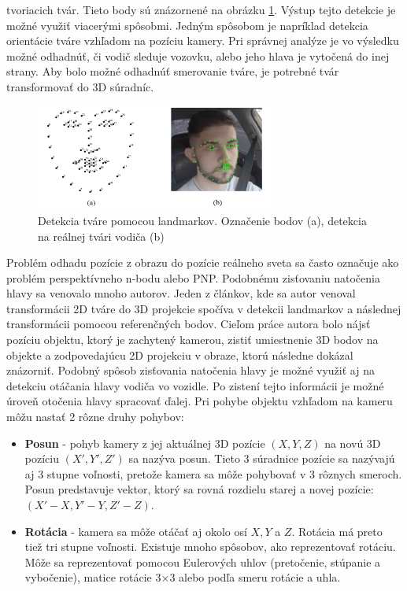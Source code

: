 \documentclass[slovak,master,dept460,male,cpp,cpdeclaration]{diploma}
\begin{document}
tvoriacich tvár. Tieto body sú znázornené na obrázku \ref{fig:landmarks}. Výstup tejto detekcie je možné využiť viacerými spôsobmi. Jedným spôsobom je napríklad detekcia orientácie tváre vzhľadom na pozíciu kamery. Pri správnej analýze je vo výsledku možné odhadnúť, či vodič sleduje vozovku, alebo jeho hlava je vytočená do inej strany. Aby bolo možné odhadnúť smerovanie tváre, je potrebné tvár transformovať do 3D súradníc.

\begin{figure}[H]
	\centering
	\includegraphics[width=0.7\textwidth]{Figures/landmarks.png}
	\caption{Detekcia tváre pomocou landmarkov. Označenie  bodov (a), detekcia na reálnej tvári vodiča (b)}
	\label{fig:landmarks}
\end{figure}


Problém odhadu pozície z obrazu do pozície reálneho sveta sa často označuje ako problém perspektívneho n-bodu alebo PNP. Podobnému zisťovaniu  natočenia hlavy sa venovalo mnoho autorov. Jeden z článkov\cite{mallick}, kde  sa autor venoval transformácii 2D tváre do 3D projekcie spočíva v detekcii landmarkov a následnej transformácii pomocou referenčných bodov. Cieľom práce autora bolo nájsť pozíciu objektu, ktorý je zachytený kamerou, zistiť umiestnenie 3D bodov na objekte a zodpovedajúcu 2D projekciu v obraze, ktorú následne dokázal znázorniť. Podobný spôsob zisťovania natočenia hlavy je možné využiť aj na detekciu otáčania hlavy vodiča vo vozidle. Po zistení tejto informácii je možné úroveň otočenia hlavy spracovať ďalej. Pri pohybe objektu vzhľadom na kameru môžu nastať 2 rôzne druhy pohybov:
\begin{itemize}
\item\textbf{Posun} - pohyb kamery z jej aktuálnej 3D pozície $(X, Y, Z)$ na novú 3D pozíciu $(X ', Y', Z ')$ sa nazýva posun. Tieto 3 súradnice pozície sa nazývajú aj 3 stupne voľnosti, pretože kamera sa môže pohybovať v 3 rôznych smeroch. Posun predstavuje vektor, ktorý sa rovná rozdielu starej a novej pozície:  $(X '- X, Y' - Y, Z '- Z)$.
\item\textbf{Rotácia} - kamera sa môže otáčať aj okolo osí $X, Y$ a $Z$. Rotácia má preto tiež tri stupne voľnosti. Existuje mnoho spôsobov, ako reprezentovať rotáciu. Môže sa reprezentovať pomocou Eulerových uhlov (pretočenie, stúpanie a vybočenie), matice rotácie 3$\times$3 alebo podľa smeru rotácie a uhla.
\end{itemize}
\end{document}
